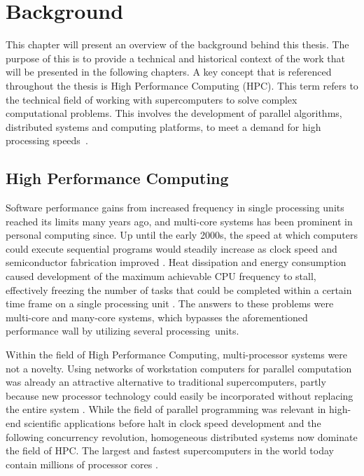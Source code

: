 \documentclass{uit-report}
\begin{document}
\newpage
\mbox{} \pagebreak
\chapter{Background}
This chapter will present an overview of the background behind this thesis. The purpose of this is to provide a technical and historical context of the work that will be presented in the following chapters. A key concept that is referenced throughout the thesis is High Performance Computing (HPC). This term refers to the technical field of working with supercomputers to solve complex computational problems. This involves the development of parallel algorithms, distributed systems and computing platforms, to meet a demand for high processing speeds~\cite{hpc_def}.

%  
\section{High Performance Computing}

Software performance gains from increased frequency in single processing units reached its limits many years ago, and multi-core systems has been prominent in personal computing since. Up until the early 2000s, the speed at which computers could execute sequential programs would steadily increase as clock speed and semiconductor fabrication improved \cite{sutter_larus_2005}. Heat dissipation and energy consumption caused development of the maximum achievable CPU frequency to stall, effectively freezing the number of tasks that could be completed within a certain time frame on a single processing unit \cite{diaz_munoz-caro_nino_2012}. The answers to these problems were multi-core and many-core systems, which bypasses the aforementioned performance wall by utilizing several processing~units.


Within the field of High Performance Computing, multi-processor systems were not a novelty. Using networks of workstation computers for parallel computation was already an attractive alternative to traditional supercomputers, partly because new processor technology could easily be incorporated without replacing the entire system \cite{wilkinson_allen_2005}. While the field of parallel programming was relevant in high-end scientific applications before halt in clock speed development and the following concurrency revolution, homogeneous distributed systems now dominate the field of HPC. The largest and fastest supercomputers in the world today contain millions of processor cores \cite{top500}.
\end{document}

